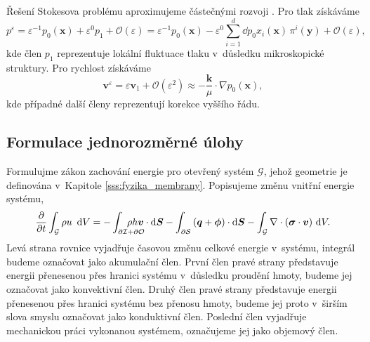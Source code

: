 Řešení Stokesova problému  aproximujeme částečnými rozvoji . Pro tlak získáváme
\begin{equation}
    p^{\varepsilon}=\varepsilon^{-1} p_0(\bm{x})+ \varepsilon^{0}p_1 + \mathcal{O}(\varepsilon)=\varepsilon^{-1} p_0(\bm{x}) - \varepsilon^{0}\sum_{i=1}^{d}\dd{p_0}{x_i}(\bm{x})\,\pi^{i}(\bm{y}) + \mathcal{O}(\varepsilon),
\end{equation}
kde člen $p_1$ reprezentuje lokální fluktuace tlaku v~důsledku mikroskopické struktury. Pro rychlost získáváme
\begin{equation}
    \bm{v}^{\varepsilon}=\varepsilon \bm{v}_1+\mathcal{O}(\varepsilon^2)\approx-\frac{\bm{k}}{\mu}\cdot\nabla p_0(\bm{x}),
\end{equation}
kde případné další členy reprezentují korekce vyššího řádu.

\subsection{Formulace jednorozměrné úlohy}\label{ss:formulace_jednorozmerne_ulohy}
Formulujme zákon zachování energie  pro otevřený systém $\mathcal{G}$, jehož geometrie je definována v~Kapitole \ref{sss:fyzika_membrany}. Popisujeme změnu vnitřní energie systému,
\begin{equation}\label{eq:1st_law_general}
    \dd{}{t}\int_{\mathcal{G}}\rho u~\d{V}
    = - \int_{\partial\mathcal{I}+\partial\mathcal{O}} \mkern-36mu \rho h \bm{v} \cdot \dvec{S}
    - \int_{\partial\mathcal{S}}\left(\bm{q}+\bm{\phi}\right)\cdot \dvec{S}
    - \int_{\mathcal{G}}\nabla \cdot \left(\bm{\sigma}\cdot\bm{v}\right) \d{V}.
\end{equation}
Levá strana rovnice vyjadřuje časovou změnu celkové energie v~systému, integrál budeme označovat jako akumulační člen. První člen pravé strany představuje energii přenesenou přes hranici systému v~důsledku proudění hmoty, budeme jej označovat jako konvektivní člen. Druhý člen pravé strany představuje energii přenesenou přes hranici systému bez přenosu hmoty, budeme jej proto v~širším slova smyslu označovat jako konduktivní člen. Poslední člen vyjadřuje mechanickou práci vykonanou systémem, označujeme jej jako objemový člen. 


